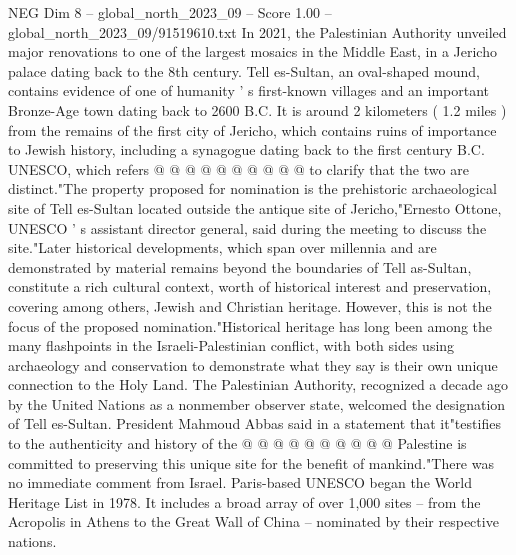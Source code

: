 \begin{textsample}{NEG Dim 8 – global\_north\_2023\_09 – Score 1.00 – global\_north\_2023\_09/91519610.txt}
In 2021, the Palestinian Authority unveiled major renovations to one of the largest mosaics in the Middle East, in a Jericho palace dating back to the 8th century.
Tell es-Sultan, an oval-shaped mound, contains evidence of one of humanity ' s first-known villages and an important Bronze-Age town dating back to 2600 B.C.
It is around 2 kilometers ( 1.2 miles ) from the remains of the first city of Jericho, which contains ruins of importance to Jewish history, including a synagogue dating back to the first century B.C.
UNESCO, which refers @ @ @ @ @ @ @ @ @ @ to clarify that the two are distinct."The property proposed for nomination is the prehistoric archaeological site of Tell es-Sultan located outside the antique site of Jericho,"Ernesto Ottone, UNESCO ' s assistant director general, said during the meeting to discuss the site."Later historical developments, which span over millennia and are demonstrated by material remains beyond the boundaries of Tell as-Sultan, constitute a rich cultural context, worth of historical interest and preservation, covering among others, Jewish and Christian heritage.
However, this is not the focus of the proposed nomination."Historical heritage has long been among the many flashpoints in the Israeli-Palestinian conflict, with both sides using archaeology and conservation to demonstrate what they say is their own unique connection to the Holy Land.
The Palestinian Authority, recognized a decade ago by the United Nations as a nonmember observer state, welcomed the designation of Tell es-Sultan.
President Mahmoud Abbas said in a statement that it"testifies to the authenticity and history of the @ @ @ @ @ @ @ @ @ @ Palestine is committed to preserving this unique site for the benefit of mankind."There was no immediate comment from Israel.
Paris-based UNESCO began the World Heritage List in 1978.
It includes a broad array of over 1,000 sites -- from the Acropolis in Athens to the Great Wall of China -- nominated by their respective nations.

\end{textsample}
